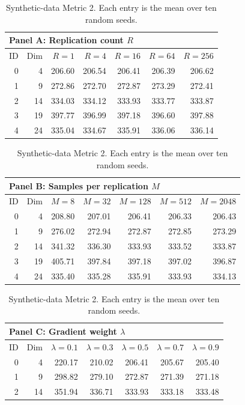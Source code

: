 \begin{table}[htbp]
\centering
\small
\setlength{\tabcolsep}{6pt}
\renewcommand{\arraystretch}{1.08}
\caption{Synthetic-data Metric 2. Each entry is the mean over ten random seeds.}
\label{tab:syn_all_parameters_metric2}
\begin{tabular}{rrrrrrr}
\toprule
\multicolumn{7}{l}{\textbf{Panel A: Replication count $R$}} \\
\midrule
ID & Dim & $R=1$ & $R=4$ & $R=16$ & $R=64$ & $R=256$ \\
\midrule
0 & 4 & 206.60 & 206.54 & 206.41 & 206.39 & 206.62 \\
1 & 9 & 272.86 & 272.70 & 272.87 & 273.29 & 272.41 \\
2 & 14 & 334.03 & 334.12 & 333.93 & 333.77 & 333.87 \\
3 & 19 & 397.77 & 396.99 & 397.18 & 396.60 & 397.88 \\
4 & 24 & 335.04 & 334.67 & 335.91 & 336.06 & 336.14 \\
\bottomrule
\end{tabular}
\par\medskip
\begin{tabular}{rrrrrrr}
\toprule
\multicolumn{7}{l}{\textbf{Panel B: Samples per replication $M$}} \\
\midrule
ID & Dim & $M=8$ & $M=32$ & $M=128$ & $M=512$ & $M=2048$ \\
\midrule
0 & 4 & 208.80 & 207.01 & 206.41 & 206.33 & 206.43 \\
1 & 9 & 276.02 & 272.94 & 272.87 & 272.85 & 273.29 \\
2 & 14 & 341.32 & 336.30 & 333.93 & 333.52 & 333.87 \\
3 & 19 & 405.71 & 397.84 & 397.18 & 397.02 & 396.87 \\
4 & 24 & 335.40 & 335.28 & 335.91 & 333.93 & 334.13 \\
\bottomrule
\end{tabular}
\par\medskip
\begin{tabular}{rrrrrrr}
\toprule
\multicolumn{7}{l}{\textbf{Panel C: Gradient weight $\lambda$}} \\
\midrule
ID & Dim & $\lambda=0.1$ & $\lambda=0.3$ & $\lambda=0.5$ & $\lambda=0.7$ & $\lambda=0.9$ \\
\midrule
0 & 4 & 220.17 & 210.02 & 206.41 & 205.67 & 205.40 \\
1 & 9 & 298.82 & 279.10 & 272.87 & 271.39 & 271.18 \\
2 & 14 & 351.94 & 336.71 & 333.93 & 333.18 & 333.48 \\

\end{tabular}
\end{table}
